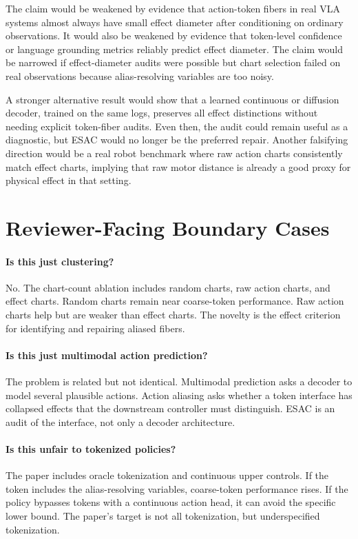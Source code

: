 \documentclass{article}
\begin{document}
The claim would be weakened by evidence that action-token fibers in real VLA
systems almost always have small effect diameter after conditioning on ordinary
observations. It would also be weakened by evidence that token-level confidence
or language grounding metrics reliably predict effect diameter. The claim would
be narrowed if effect-diameter audits were possible but chart selection failed
on real observations because alias-resolving variables are too noisy.

A stronger alternative result would show that a learned continuous or diffusion
decoder, trained on the same logs, preserves all effect distinctions without
needing explicit token-fiber audits. Even then, the audit could remain useful as
a diagnostic, but ESAC would no longer be the preferred repair. Another
falsifying direction would be a real robot benchmark where raw action charts
consistently match effect charts, implying that raw motor distance is already a
good proxy for physical effect in that setting.

\section{Reviewer-Facing Boundary Cases}

\paragraph{Is this just clustering?}
No. The chart-count ablation includes random charts, raw action charts, and
effect charts. Random charts remain near coarse-token performance. Raw action
charts help but are weaker than effect charts. The novelty is the effect
criterion for identifying and repairing aliased fibers.

\paragraph{Is this just multimodal action prediction?}
The problem is related but not identical. Multimodal prediction asks a decoder
to model several plausible actions. Action aliasing asks whether a token
interface has collapsed effects that the downstream controller must distinguish.
ESAC is an audit of the interface, not only a decoder architecture.

\paragraph{Is this unfair to tokenized policies?}
The paper includes oracle tokenization and continuous upper controls. If the
token includes the alias-resolving variables, coarse-token performance rises.
If the policy bypasses tokens with a continuous action head, it can avoid the
specific lower bound. The paper's target is not all tokenization, but
underspecified tokenization.
\end{document}
